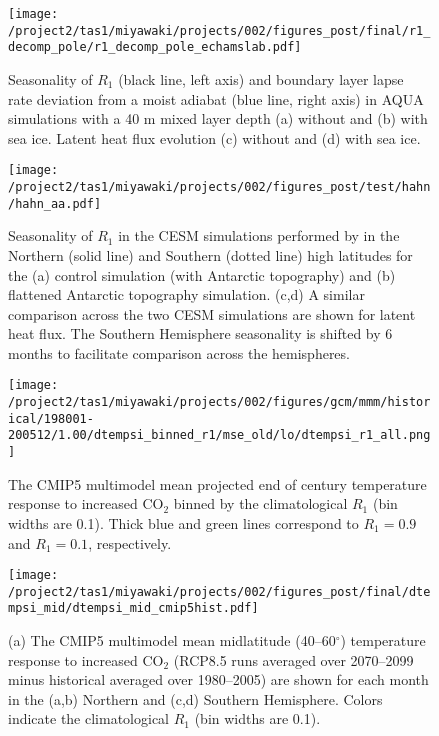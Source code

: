 \documentclass{ametsocV5}
\begin{document}
\begin{figure}[t]
    \noindent\texttt{[image: /project2/tas1/miyawaki/projects/002/figures\_post/final/r1\_decomp\_pole/r1\_decomp\_pole\_echamslab.pdf]}\\
    \caption{Seasonality of $R_1$ (black line, left axis) and boundary layer lapse rate deviation from a moist adiabat (blue line, right axis) in AQUA simulations with a 40 m mixed layer depth (a) without and (b) with sea ice. Latent heat flux evolution (c) without and (d) with sea ice.}
    \label{fig:echam-rae}
\end{figure}

\begin{figure}[t]
    \noindent\texttt{[image: /project2/tas1/miyawaki/projects/002/figures\_post/test/hahn/hahn\_aa.pdf]}\\
    \caption{Seasonality of $R_1$ in the CESM simulations performed by \cite{hahn2020} in the Northern (solid line) and Southern (dotted line) high latitudes for the (a) control simulation (with Antarctic topography) and (b) flattened Antarctic topography simulation. (c,d) A similar comparison across the two CESM simulations are shown for latent heat flux. The Southern Hemisphere seasonality is shifted by 6 months to facilitate comparison across the hemispheres.}
    \label{fig:hahn-aa}
\end{figure}

\begin{figure}
  \centering
  \noindent\texttt{[image: /project2/tas1/miyawaki/projects/002/figures/gcm/mmm/historical/198001-200512/1.00/dtempsi\_binned\_r1/mse\_old/lo/dtempsi\_r1\_all.png]}
  \caption{The CMIP5 multimodel mean projected end of century temperature response to increased CO$_2$ binned by the climatological $R_{1}$ (bin widths are 0.1). Thick blue and green lines correspond to $R_1=0.9$ and $R_1=0.1$, respectively.}
  \label{fig:cmip5-dtemp-binned-r1}
\end{figure}

\begin{figure}
  \centering
  \noindent\texttt{[image: /project2/tas1/miyawaki/projects/002/figures\_post/final/dtempsi\_mid/dtempsi\_mid\_cmip5hist.pdf]}\\
  \caption{(a) The CMIP5 multimodel mean midlatitude (40--60$^{\circ}$) temperature response to increased CO$_2$ (RCP8.5 runs averaged over 2070--2099 minus historical averaged over 1980--2005) are shown for each month in the (a,b) Northern and (c,d) Southern Hemisphere. Colors indicate the climatological $R_{1}$ (bin widths are 0.1).}
  \label{fig:cmip5-dtemp-mid}
\end{figure}
\end{document}
